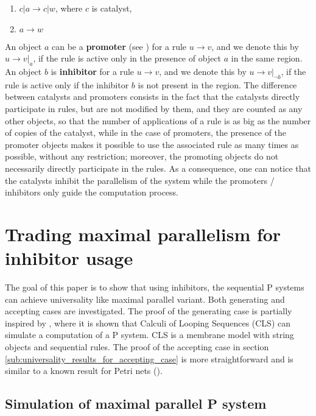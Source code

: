 \documentclass[llncs,submission,copyright,creativecommons]{../lib/lncs/llncs}
\begin{document}
\begin{enumerate}
	\item $c|a\rightarrow c|w$, where $c$ is catalyst,
	\item $a\rightarrow w$
\end{enumerate}

An object $a$ can be a {\bf promoter} (see \cite{Ionescu:jucs_10_5:on_p_systems_with}) for a rule $u\rightarrow v$, and we denote this by $u\rightarrow v|_a$, if the rule is active only in the presence of object $a$ in the same region. An object $b$ is {\bf inhibitor} for a rule $u\rightarrow v$, and we denote this by $u\rightarrow v|_{\neg b}$, if the rule is active only if the inhibitor $b$ is not present in the region.
The difference between catalysts and promoters consists in the fact that the catalysts directly participate in rules, but are not modified by them, and they are counted as any other objects, so that the number of applications of a rule is as big as the number of copies of the catalyst, while in the case of promoters, the presence of the promoter objects makes it possible to use the associated rule as many times as possible, without any restriction; moreover, the promoting objects do not necessarily directly participate in the rules. As a consequence, one can notice that the catalysts inhibit the parallelism of the system while the promoters / inhibitors only guide the computation process.

\section{Trading maximal parallelism for inhibitor usage}
\label{sec:inhibitors}
The goal of this paper is to show that using inhibitors, the sequential P systems can achieve universality like maximal parallel variant.
Both generating and accepting cases are investigated.
The proof of the generating case is partially inspired by \cite{Barbuti07thecalculus}, where it is shown that Calculi of Looping Sequences (CLS) can simulate a computation of a P system. CLS is a membrane model with string objects and sequential rules.
The proof of the accepting case in section \ref{sub:universality_results_for_accepting_case} is more straightforward and is similar to a known result for Petri nets (\cite{Agerwala74}).

\subsection{Simulation of maximal parallel P system} %
\label{sub:simulation_of_maximal_parallel_p_system}
\end{document}
